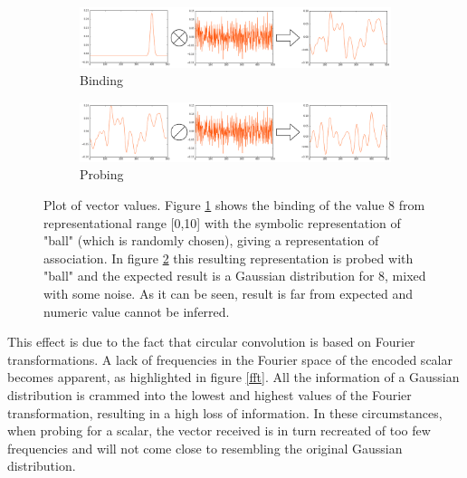 \documentclass[journal]{journal}
\begin{document}
	
	\begin{figure}[th!]
		\begin{subfigure}{1\columnwidth}
			\includegraphics[width=\columnwidth]{img/scalar-pre-perm.png}
			\caption{Binding}
			\label{no-perm-a}
		\end{subfigure}
		\begin{subfigure}{1\columnwidth}
			\includegraphics[width=\columnwidth]{img/scalar-pre-perm-probe.png}
			\caption{Probing}
			\label{no-perm-b}
		\end{subfigure}
		\caption{Plot of vector values.
Figure \ref{no-perm-a} shows the binding of the value 8 from representational range [0,10] with the symbolic representation of "ball" (which is randomly chosen), giving a representation of association.
In figure \ref{no-perm-b} this resulting representation is probed with "ball" and the expected result is a Gaussian distribution for 8, mixed with some noise. As it can be seen, result is far from expected and numeric value cannot be inferred.}
		\label{no-perm}
	\end{figure}
	
	This effect is due to the fact that circular convolution is based on Fourier transformations. A lack of frequencies in the Fourier space of the encoded scalar becomes apparent, as highlighted in figure \ref{fft}.
All the information of a Gaussian distribution is crammed into the lowest and highest values of the Fourier transformation, resulting in a high loss of information.
In these circumstances, when probing for a scalar, the vector received is in turn recreated of too few frequencies and will not come close to resembling the original Gaussian distribution.
\end{document}
